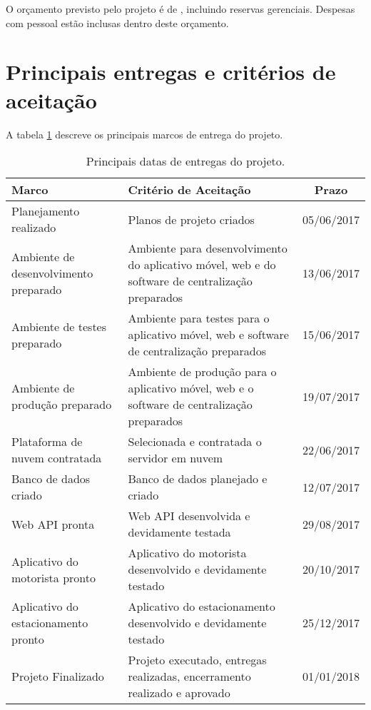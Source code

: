 O orçamento previsto pelo projeto é de \maximumBudget{}, incluindo reservas gerenciais. Despesas com pessoal estão inclusas dentro deste orçamento.

\section{Principais entregas e critérios de aceitação}

A tabela \ref{tab:entregas} descreve os principais marcos de entrega do projeto.

\begin{table}[H]
	\begin{tabularx}{.9\textwidth}{| X | X | c |}
		\hline
		\textbf{Marco}                        & \textbf{Critério de Aceitação}                                                                   & \textbf{Prazo} \\
		\hline
		Planejamento realizado                & Planos de projeto criados                                                                           & 05/06/2017     \\
		\hline
		Ambiente de desenvolvimento preparado & Ambiente para desenvolvimento do aplicativo móvel, web e do software de centralização preparados & 13/06/2017     \\
		\hline
		Ambiente de testes preparado          & Ambiente para testes para o aplicativo móvel, web e software de centralização preparados         & 15/06/2017     \\
		\hline
		Ambiente de produção preparado      & Ambiente de produção para o aplicativo móvel, web e o software de centralização preparados     & 19/07/2017     \\
		\hline
		Plataforma de nuvem contratada        & Selecionada e contratada o servidor em nuvem                                                        & 22/06/2017     \\
		\hline
		Banco de dados criado                 & Banco de dados planejado e criado                                                                   & 12/07/2017     \\
		\hline
		Web API pronta                        & Web API desenvolvida e devidamente testada                                                          & 29/08/2017     \\
		\hline
		Aplicativo do motorista pronto        & Aplicativo do motorista desenvolvido e devidamente testado                                          & 20/10/2017     \\
		\hline
		Aplicativo do estacionamento pronto   & Aplicativo do estacionamento desenvolvido e devidamente testado                                     & 25/12/2017     \\
		\hline
		Projeto Finalizado                    & Projeto executado, entregas realizadas, encerramento realizado e aprovado                           & 01/01/2018     \\
		\hline
	\end{tabularx}
	\centering
	\caption{Principais datas de entregas do projeto.}
	\label{tab:entregas}
\end{table}

